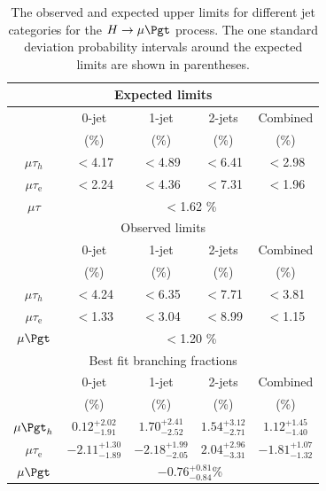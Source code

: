 \begin{table}[hbtp]
 \centering
  \caption{The observed and expected upper limits for different
    jet categories for the $H \rightarrow \mu \Pgt$  process.
    The one standard deviation probability intervals around the expected limits are shown in parentheses.}
 \label{tab:expected_limits}
\begin{tabular}{c|c|c|c|c} \hline
\multicolumn{5}{c}{Expected limits} \\ \hline
                       &  \multicolumn{1}{c|}{0-jet}   & \multicolumn{1}{c|}{1-jet}    &  \multicolumn{1}{c|}{2-jets} & \multicolumn{1}{c}{Combined}                 \\
                       & (\%)                     & (\%)                     & (\%)  &    (\%)                  \\   \cline{2-5}
          $\mu\tau_{h}$  & $<$4.17  & $<$4.89   & $<$6.41   &   $<$2.98   \\
      $\mu\tau_{\textrm{e}}$           & $<$2.24   &  $<$4.36  &  $<$7.31  &  $<$1.96    \\ \hline
            $\mu\tau$      &        \multicolumn{4}{c}{  $<$1.62  \% }                              \\ \hline \hline
\multicolumn{5}{c}{Observed limits} \\ \hline
                       &  \multicolumn{1}{c|}{0-jet}   & \multicolumn{1}{c|}{1-jet}    &  \multicolumn{1}{c|}{2-jets} & \multicolumn{1}{c}{Combined}                 \\
                       & (\%)                     & (\%)                     & (\%)  &    (\%)                  \\   \cline{2-5}
          $\mu\tau_{h}$  & $<$4.24  & $<$6.35   & $<$7.71   &   $<$3.81   \\
      $\mu\tau_{\textrm{e}}$           & $<$1.33   &  $<$3.04  &  $<$8.99  &  $<$1.15    \\ \hline
            $\mu\Pgt$      &        \multicolumn{4}{c}{  $<$1.20  \% }                              \\ \hline \hline
\multicolumn{5}{c}{Best fit branching fractions} \\ \hline
                       &  \multicolumn{1}{c|}{0-jet}   & \multicolumn{1}{c|}{1-jet}    &  \multicolumn{1}{c|}{2-jets} & \multicolumn{1}{c}{Combined}                 \\
                       & (\%)                     & (\%)                     & (\%)  &    (\%)                  \\   \cline{2-5}
      \rule[-5pt]{0pt}{17pt}
      $\mu\Pgt_{h}$  &  $0.12^{+2.02}_{-1.91}$  &  $1.70^{+2.41}_{-2.52}$  &  $1.54^{+3.12}_{-2.71}$  &   $1.12^{+1.45}_{-1.40}$   \\
      \rule[-5pt]{0pt}{17pt}
      $\mu\tau_{\textrm{e}}$    &  $-2.11^{+1.30}_{-1.89}$  &  $-2.18^{+1.99}_{-2.05}$  &  $2.04^{+2.96}_{-3.31}$ & $-1.81_{-1.32}^{+1.07}$  \\ \hline
      \rule[-5pt]{0pt}{17pt}
      $\mu\Pgt$  & \multicolumn{4}{c}{ $-0.76^{+0.81}_{-0.84}$\% }   \\ \hline
  \end{tabular}
\end{table}


